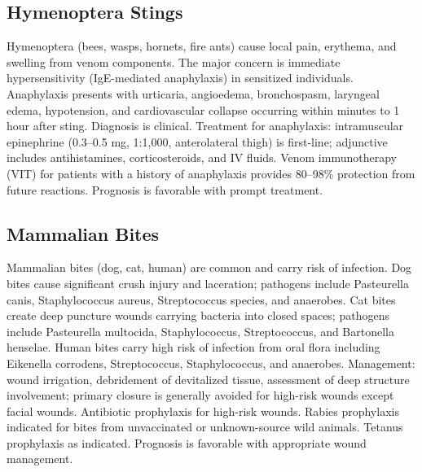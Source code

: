 






\label{sec:Envenomation and Bites}

\subsection{Hymenoptera Stings}
\label{sec:Hymenoptera Stings}
Hymenoptera (bees, wasps, hornets, fire ants) cause local pain, erythema, and swelling from venom components. The major concern is immediate hypersensitivity (IgE-mediated anaphylaxis) in sensitized individuals. Anaphylaxis presents with urticaria, angioedema, bronchospasm, laryngeal edema, hypotension, and cardiovascular collapse occurring within minutes to 1 hour after sting. Diagnosis is clinical. Treatment for anaphylaxis: intramuscular epinephrine (0.3--0.5 mg, 1:1,000, anterolateral thigh) is first-line; adjunctive includes antihistamines, corticosteroids, and IV fluids. Venom immunotherapy (VIT) for patients with a history of anaphylaxis provides 80--98\% protection from future reactions. Prognosis is favorable with prompt treatment.

\subsection{Mammalian Bites}
\label{sec:Mammalian Bites}
Mammalian bites (dog, cat, human) are common and carry risk of infection. Dog bites cause significant crush injury and laceration; pathogens include Pasteurella canis, Staphylococcus aureus, Streptococcus species, and anaerobes. Cat bites create deep puncture wounds carrying bacteria into closed spaces; pathogens include Pasteurella multocida, Staphylococcus, Streptococcus, and Bartonella henselae. Human bites carry high risk of infection from oral flora including Eikenella corrodens, Streptococcus, Staphylococcus, and anaerobes. Management: wound irrigation, debridement of devitalized tissue, assessment of deep structure involvement; primary closure is generally avoided for high-risk wounds except facial wounds. Antibiotic prophylaxis for high-risk wounds. Rabies prophylaxis indicated for bites from unvaccinated or unknown-source wild animals. Tetanus prophylaxis as indicated. Prognosis is favorable with appropriate wound management.

